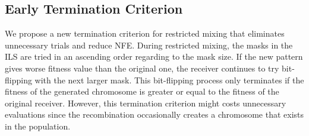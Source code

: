 \documentclass{sig-alternate-05-2015}
\begin{document}
\subsection{Early Termination Criterion}

We propose a new termination criterion for restricted mixing that eliminates unnecessary trials and reduce NFE. During restricted mixing, the masks in the ILS are tried in an ascending order regarding to the mask size. If the new pattern gives worse fitness value than the original one, the receiver continues to try bit-flipping with the next larger mask. This bit-flipping process only terminates if the fitness of the generated chromosome is greater or equal to the fitness of the original receiver. However, this termination criterion might costs unnecessary evaluations since the recombination occasionally creates a chromosome that exists in the population. 
\end{document}
